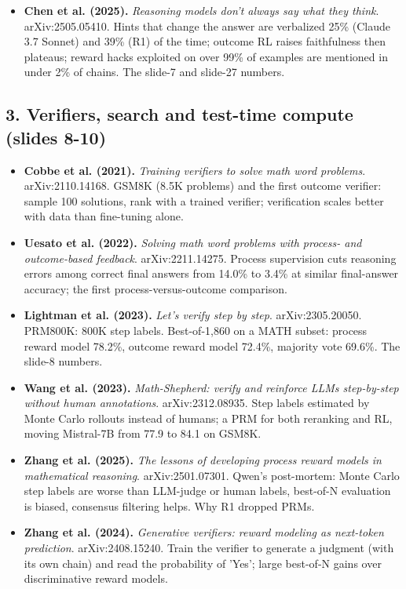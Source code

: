 \begin{itemize}[leftmargin=1.2em,itemsep=3pt]
\item \textbf{Chen et al. (2025).} \textit{Reasoning models don't always say what they think}. arXiv:2505.05410. Hints that change the answer are verbalized 25\% (Claude 3.7 Sonnet) and 39\% (R1) of the time; outcome RL raises faithfulness then plateaus; reward hacks exploited on over 99\% of examples are mentioned in under 2\% of chains. The slide-7 and slide-27 numbers.
\end{itemize}
\subsection*{3. Verifiers, search and test-time compute (slides 8-10)}
\begin{itemize}[leftmargin=1.2em,itemsep=3pt]\sloppy
\item \textbf{Cobbe et al. (2021).} \textit{Training verifiers to solve math word problems}. arXiv:2110.14168. GSM8K (8.5K problems) and the first outcome verifier: sample 100 solutions, rank with a trained verifier; verification scales better with data than fine-tuning alone.
\item \textbf{Uesato et al. (2022).} \textit{Solving math word problems with process- and outcome-based feedback}. arXiv:2211.14275. Process supervision cuts reasoning errors among correct final answers from 14.0\% to 3.4\% at similar final-answer accuracy; the first process-versus-outcome comparison.
\item \textbf{Lightman et al. (2023).} \textit{Let's verify step by step}. arXiv:2305.20050. PRM800K: 800K step labels. Best-of-1,860 on a MATH subset: process reward model 78.2\%, outcome reward model 72.4\%, majority vote 69.6\%. The slide-8 numbers.
\item \textbf{Wang et al. (2023).} \textit{Math-Shepherd: verify and reinforce LLMs step-by-step without human annotations}. arXiv:2312.08935. Step labels estimated by Monte Carlo rollouts instead of humans; a PRM for both reranking and RL, moving Mistral-7B from 77.9 to 84.1 on GSM8K.
\item \textbf{Zhang et al. (2025).} \textit{The lessons of developing process reward models in mathematical reasoning}. arXiv:2501.07301. Qwen's post-mortem: Monte Carlo step labels are worse than LLM-judge or human labels, best-of-N evaluation is biased, consensus filtering helps. Why R1 dropped PRMs.
\item \textbf{Zhang et al. (2024).} \textit{Generative verifiers: reward modeling as next-token prediction}. arXiv:2408.15240. Train the verifier to generate a judgment (with its own chain) and read the probability of 'Yes'; large best-of-N gains over discriminative reward models.

\end{itemize}
